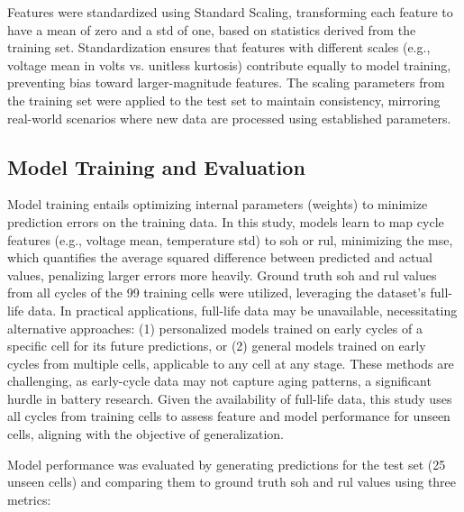 Features were standardized using Standard Scaling, transforming each feature to have a mean of zero and a \acf{std} of one, based on statistics derived from the training set. Standardization ensures that features with different scales (e.g., voltage mean in volts vs. unitless kurtosis) contribute equally to model training, preventing bias toward larger-magnitude features. The scaling parameters from the training set were applied to the test set to maintain consistency, mirroring real-world scenarios where new data are processed using established parameters.

\subsection{Model Training and Evaluation}

Model training entails optimizing internal parameters (weights) to minimize prediction errors on the training data. In this study, models learn to map cycle features (e.g., voltage mean, temperature \ac{std}) to \ac{soh} or \ac{rul}, minimizing the \acf{mse}, which quantifies the average squared difference between predicted and actual values, penalizing larger errors more heavily. Ground truth \ac{soh} and \ac{rul} values from all cycles of the 99 training cells were utilized, leveraging the dataset’s full-life data. In practical applications, full-life data may be unavailable, necessitating alternative approaches: (1) personalized models trained on early cycles of a specific cell for its future predictions, or (2) general models trained on early cycles from multiple cells, applicable to any cell at any stage. These methods are challenging, as early-cycle data may not capture aging patterns, a significant hurdle in battery research. Given the availability of full-life data, this study uses all cycles from training cells to assess feature and model performance for unseen cells, aligning with the objective of generalization.

Model performance was evaluated by generating predictions for the test set (25 unseen cells) and comparing them to ground truth \ac{soh} and \ac{rul} values using three metrics:

